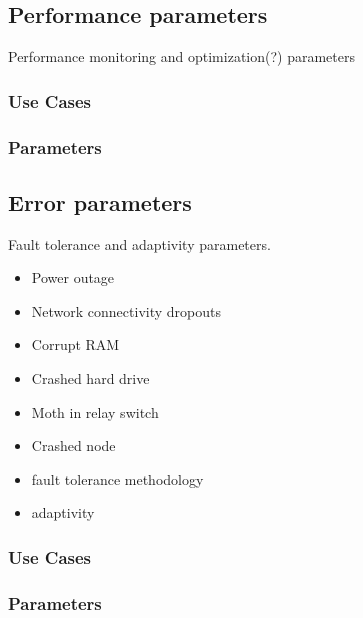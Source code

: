 \subsection{Performance parameters} \label{ss:parames-performance}

Performance monitoring and optimization(?) parameters

\subsubsection{Use Cases}
\subsubsection{Parameters}

\subsection{Error parameters} \label{ss:params-error}

Fault tolerance and adaptivity parameters.

\begin{itemize}
\item Power outage
\item Network connectivity dropouts
\item Corrupt RAM
\item Crashed hard drive
\item Moth in relay switch
\item Crashed node
\end{itemize}

\begin{itemize}
\item fault tolerance methodology
\item adaptivity
\end{itemize}

\subsubsection{Use Cases}
\subsubsection{Parameters}
